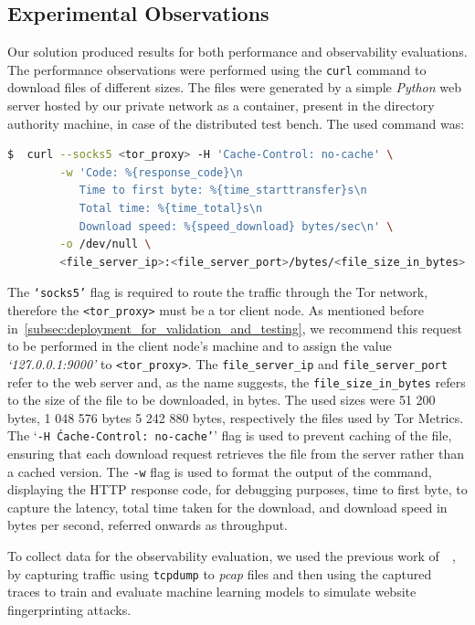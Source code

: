 \subsection{Experimental Observations}\label{sec:experimental_observations}

Our solution produced results for both performance and observability evaluations. The performance observations were performed using the \texttt{curl} command to download files of different sizes. The files were generated by a simple \textit{Python} web server hosted by our private network as a container, present in the directory authority machine, in case of the distributed test bench. The used command was:

\begin{lstlisting}[language=bash, float]
  $  curl --socks5 <tor_proxy> -H 'Cache-Control: no-cache' \
        -w 'Code: %{response_code}\n
           Time to first byte: %{time_starttransfer}s\n
           Total time: %{time_total}s\n
           Download speed: %{speed_download} bytes/sec\n' \
        -o /dev/null \
        <file_server_ip>:<file_server_port>/bytes/<file_size_in_bytes>
\end{lstlisting}

The \texttt{`socks5'} flag is required to route the traffic through the Tor network, therefore the \texttt{<tor\_proxy>} must be a tor client node. As mentioned before in~\cref{subsec:deployment_for_validation_and_testing}, we recommend this request to be performed in the client node's machine and to assign the value \textit{`127.0.0.1:9000'} to \texttt{<tor\_proxy>}. The \texttt{file\_server\_ip} and \texttt{file\_server\_port} refer to the web server and, as the name suggests, the \texttt{file\_size\_in\_bytes} refers to the size of the file to be downloaded, in bytes. The used sizes were 51 200 bytes, 1 048 576 bytes 5 242 880 bytes, respectively the files used by Tor Metrics. The `\texttt{-H \'Cache-Control: no-cache'}' flag is used to prevent caching of the file, ensuring that each download request retrieves the file from the server rather than a cached version. The \texttt{-w} flag is used to format the output of the command, displaying the HTTP response code, for debugging purposes, time to first byte, to capture the latency, total time taken for the download, and download speed in bytes per second, referred onwards as throughput.

To collect data for the observability evaluation, we used the previous work of~\citeauthor{MIRACE}~\cite{MIRACE}, by capturing traffic using \texttt{tcpdump} to \textit{pcap} files and then using the captured traces to train and evaluate machine learning models to simulate website fingerprinting attacks. 

